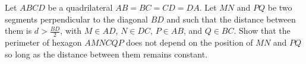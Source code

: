 Let $ABCD$ be a quadrilateral $AB = BC = CD = DA$.  Let $MN$ and $PQ$ be two segments perpendicular to the diagonal $BD$ and such that the distance between them is $d > \frac{BD}{2}$, with $M \in AD$, $N \in DC$, $P \in AB$, and $Q \in BC$. Show that the perimeter of hexagon $AMNCQP$ does not depend on the position of $MN$ and $PQ$ so long as the distance between them remains constant.